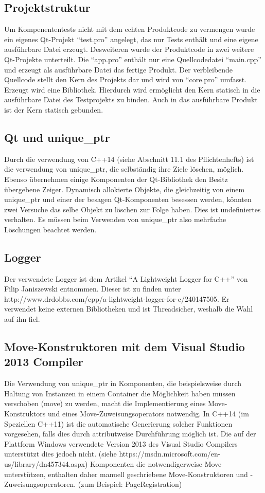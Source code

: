 \subsection{Projektstruktur}
Um Kompenententests nicht mit dem echten Produktcode zu vermengen wurde ein eigenes Qt-Projekt \enquote{test.pro}
angelegt, das nur Tests enthält und eine eigene ausführbare Datei erzeugt. Desweiteren wurde der Produktcode in zwei weitere Qt-Projekte unterteilt. Die \enquote{app.pro} enthält nur eine Quellcodedatei \enquote{main.cpp} und erzeugt als ausführbare Datei das fertige Produkt. Der verbleibende Quellcode stellt den Kern des Projekts dar und wird von \enquote{core.pro} umfasst. Erzeugt wird eine Bibliothek. Hierdurch wird ermöglicht den Kern statisch in die ausführbare Datei des Testprojekts zu binden. Auch in das ausführbare Produkt ist der Kern statisch gebunden.

\subsection{Qt und unique_ptr}
Durch die verwendung von C++14 (siehe Abschnitt 11.1 des Pflichtenhefts) ist die verwendung von unique\_ptr, die selbständig ihre Ziele löschen, möglich. Ebenso übernehmen einige Komponenten der Qt-Bibliothek den Besitz übergebene Zeiger. Dynamisch allokierte Objekte, die gleichzeitig von einem unique\_ptr und einer der besagen Qt-Komponenten besessen werden, könnten zwei Versuche das selbe Objekt zu löschen zur Folge haben. Dies ist undefiniertes verhalten. Es müssen beim Verwenden von unique\_ptr also mehrfache Löschungen beachtet werden.

\subsection{Logger}
Der verwendete Logger ist dem Artikel \enquote{A Lightweight Logger for C++} von Filip Janiszewski entnommen.
Dieser ist zu finden unter http://www.drdobbs.com/cpp/a-lightweight-logger-for-c/240147505.
Er verwendet keine externen Bibliotheken und ist Threadsicher, weshalb die Wahl auf ihn fiel.

\subsection{Move-Konstruktoren mit dem Visual Studio 2013 Compiler}
Die Verwendung von unique\_ptr in Komponenten, die beispielsweise durch Haltung von Instanzen in einem Container die Möglichkeit haben müssen verschoben (move) zu werden, macht die Implementierung eines Move-Konstruktors und eines Move-Zuweisungsoperators notwendig. In C++14 (im Speziellen C++11) ist die automatische Generierung solcher Funktionen vorgesehen, falls dies durch attributweise Durchführung möglich ist. Die auf der Plattform Windows verwendete Version 2013 des Visual Studio Compilers unterstützt dies jedoch nicht. (siehe https://msdn.microsoft.com/en-us/library/dn457344.aspx)
Komponenten die notwendigerweise Move unterstützen, enthalten daher manuell geschriebene Move-Konstruktoren und -Zuweisungsoperatoren. (zum Beispiel: PageRegistration)

